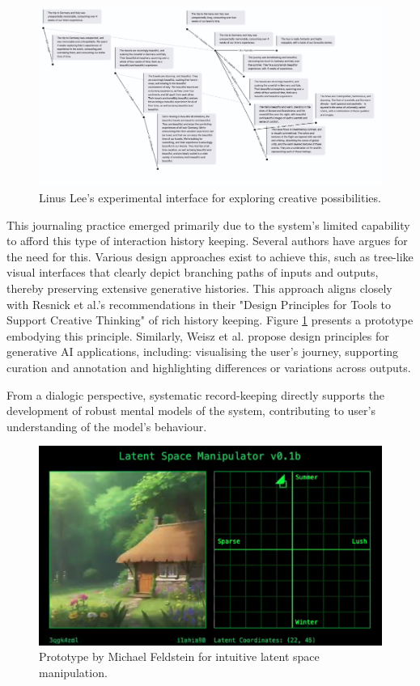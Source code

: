 \begin{figure}[H]
\centering
\includegraphics[width=0.8\linewidth]{linus.png}
\caption{Linus Lee's experimental interface for exploring creative possibilities.}
\label{fig:linus}
\end{figure}

This journaling practice emerged primarily due to the system's limited capability to afford this type of interaction history keeping. Several authors have argues for the need for this. Various design approaches exist to achieve this, such as tree-like visual interfaces that clearly depict branching paths of inputs and outputs, thereby preserving extensive generative histories. This approach aligns closely with Resnick et al.'s recommendations in their "Design Principles for Tools to Support Creative Thinking" \cite{Resnick2005-fs} of rich history keeping. Figure \ref{fig:linus} presents a prototype embodying this principle. Similarly, Weisz et al. propose design principles for generative AI applications, including: visualising the user's journey, supporting curation and annotation and highlighting differences or variations across outputs.

From a dialogic perspective, systematic record-keeping directly supports the development of robust mental models of the system, contributing to user's understanding of the model's behaviour.

\begin{figure}[H]
\centering
\includegraphics[width=0.8\linewidth]{latentspacemanip.png}
\caption{Prototype by Michael Feldstein for intuitive latent space manipulation.}
\label{fig:feldstein}
\end{figure}

